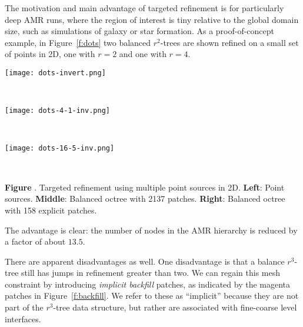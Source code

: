 \documentclass[11pt,letterpaper]{article}
\newcounter{figctr}
\newcommand{\FIGURE}[3]{
\noindent
\parbox{\textwidth}{
\begin{center}
#3
\end{center}%
\ \nolinebreak%
\refstepcounter{figctr}%
\begin{center}%
\begin{minipage}{7.0in}
\textbf{Figure \thefigctr}. #1
\end{minipage}
\end{center}
\label{#2}
}}
\begin{document}
The motivation and main advantage of targeted refinement is for
particularly deep AMR runs, where the region of interest is tiny
relative to the global domain size, such as simulations of galaxy or
star formation.  As a proof-of-concept example, in Figure~\ref{f:dots}
two balanced $r^2$-trees are shown refined on a small set of points in 2D, one
with $r=2$ and one with $r=4$.


\FIGURE{
Targeted refinement using multiple point sources in 2D.
 \textbf{Left}: Point sources.  
 \textbf{Middle}: Balanced octree with 2137 patches.
 \textbf{Right}: Balanced octree with 158 explicit patches.
}
{f:dots}{
\begin{minipage}{7.0in}
\begin{minipage}{2.2in}
\texttt{[image: dots-invert.png]}
\end{minipage} \ 
\begin{minipage}{2.2in}
\texttt{[image: dots-4-1-inv.png]}
\end{minipage} \ 
\begin{minipage}{2.2in}
\texttt{[image: dots-16-5-inv.png]}
\end{minipage}
\end{minipage}}

The advantage is clear: the number of nodes in the AMR hierarchy is
reduced by a factor of about $13.5$.  

There are apparent disadvantages as well.  One disadvantage is that a
balance $r^3$-tree still has jumps in refinement greater than two.  We
can regain this mesh constraint by introducing \textit{implicit
  backfill} patches, as indicated by the magenta patches in
Figure~\ref{f:backfill}.  We refer to these as ``implicit'' because
they are not part of the $r^3$-tree data structure, but rather are
associated with fine-coarse level interfaces.
\end{document}
